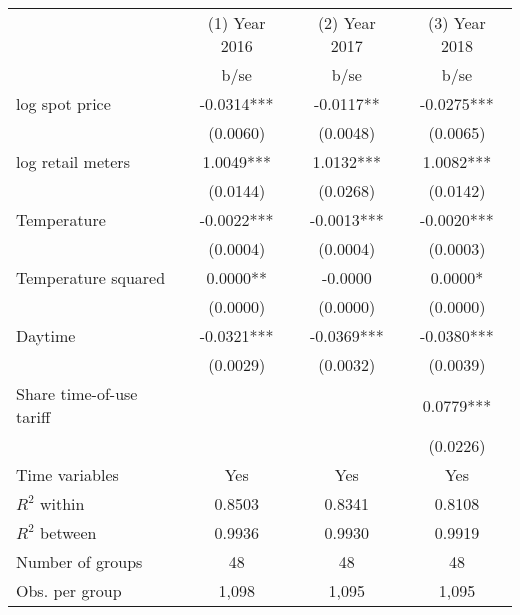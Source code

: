 \begin{tabular}{lccc}\toprule
                    &    (1) Year 2016   &    (2) Year 2017   &   (3) Year 2018   \\
                    &        b/se   &        b/se   &        b/se   \\
\midrule
log spot price      &     -0.0314***&     -0.0117** &     -0.0275***\\
                    &    (0.0060)   &    (0.0048)   &    (0.0065)   \\
log retail meters   &      1.0049***&      1.0132***&      1.0082***\\
                    &    (0.0144)   &    (0.0268)   &    (0.0142)   \\
Temperature         &     -0.0022***&     -0.0013***&     -0.0020***\\
                    &    (0.0004)   &    (0.0004)   &    (0.0003)   \\
Temperature squared &      0.0000** &     -0.0000   &      0.0000*  \\
                    &    (0.0000)   &    (0.0000)   &    (0.0000)   \\
Daytime             &     -0.0321***&     -0.0369***&     -0.0380***\\
                    &    (0.0029)   &    (0.0032)   &    (0.0039)   \\
Share time-of-use tariff&               &               &      0.0779***\\
                    &               &               &    (0.0226)   \\
Time variables      &         Yes   &         Yes   &         Yes   \\
\midrule
\(R^2\) within      &      0.8503   &      0.8341   &      0.8108   \\
\(R^2\) between     &      0.9936   &      0.9930   &      0.9919   \\
Number of groups    &          48   &          48   &          48   \\
Obs. per group      &       1,098   &       1,095   &       1,095   \\
\bottomrule\end{tabular}
